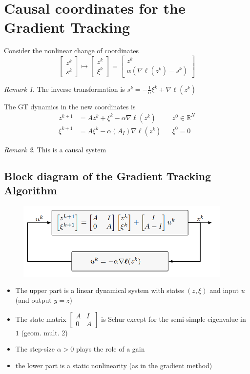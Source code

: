 \documentclass{book}
\newcommand{\R}{\mathbb{R}}
\theoremstyle{theoremv2}
\theoremstyle{defv2}
\theoremstyle{remark}
\newtheorem*{remark}{Remark}
\theoremstyle{remark}
\theoremstyle{definition}
\theoremstyle{definition}
\begin{document}
\section{Causal coordinates for the Gradient Tracking}
Consider the nonlinear change of coordinates 
\[
    \begin{bmatrix}
        z^k \\ s^k
    \end{bmatrix} \mapsto \begin{bmatrix}
        z^k \\ \xi^k
    \end{bmatrix} = \begin{bmatrix}
        z^k \\ \alpha(\nabla\boldsymbol{\ell}(z^k)-s^k)
    \end{bmatrix}
\]
\begin{remark}
    The inverse transformation is $s^k = -\frac{1}{\alpha}\xi^k + \nabla \boldsymbol{\ell}(z^k)$
\end{remark}
The GT dynamics in the new coordinates is 
\begin{align*}
    z^{k+1} &= Az^k + \xi^k - \alpha\nabla\boldsymbol{\ell}(z^k) && z^0\in\R^N\\
    \xi^{k+1} &= A\xi^k - \alpha(A_I)\nabla\boldsymbol{\ell}(z^k) && \xi^0 = 0
\end{align*}
\begin{remark}
    This is a causal system
\end{remark}

\subsection{Block diagram of the Gradient Tracking Algorithm}
\begin{figure}[H]
    \begin{center}
        \includegraphics[width=0.95\textwidth]{figures/gradtrack}
    \end{center}
\end{figure}
\begin{itemize}
    \item The upper part is a linear dynamical system with states $(z,\xi)$ and input $u$ (and output $y=z$)
    \item The state matrix $\begin{bmatrix}
            A & I \\ 0 & A
    \end{bmatrix}$ is Schur except for the semi-simple eigenvalue in $1$ (geom. mult. 2)
    \item The step-size $\alpha>0$ plays the role of a gain
    \item the lower part is a static nonlinearity (as in the gradient method)
\end{itemize}
\end{document}

